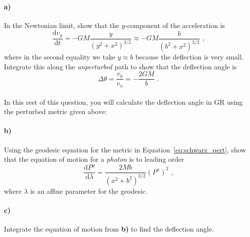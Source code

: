\documentclass[12pt]{article}
\newcommand\diff{\mathrm{d}}
\begin{document}
\paragraph{a)} In the Newtonian limit, show that the $y$-component of the acceleration is
\begin{equation}
    \frac{\diff v_y}{\diff t} = - G M \frac{y}{\left(y^2 + x^2\right)^{3/2}}
    \approx - G M \frac{b}{\left(b^2 + x^2\right)^{3/2}} \text{ ,}
\end{equation}
where in the second equality we take $y \approx b$ because the deflection is
very small.
Integrate this along the \emph{unperturbed} path to show that the deflection angle is
\begin{equation}
    \Delta \theta = \frac{v_y}{v_x} = - \frac{2 G M}{b} \; .
\end{equation} \\[10pt]
In this rest of this question, you will calculate the deflection angle in GR using the
perturbed metric given above:

\paragraph{b)} Using the geodesic equation for the metric in
Equation~\ref{eq:schwarz_pert}, show that the equation of motion for a \emph{photon} is to leading order
\begin{equation}
    \frac{\diff P^y}{\diff \lambda}
    = \frac{2 M b}{\left(x^2 + b^2\right)^{3/2}} (P^x)^2 \text{ ,}
\end{equation}
where $\lambda$ is an affine parameter for the geodesic.

\paragraph{c)} Integrate the equation of motion from \textbf{b)} to find the
deflection angle.
\end{document}

